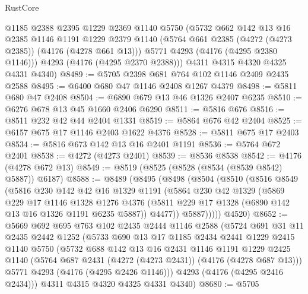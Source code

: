 \begin{lexlean}{RustCore}
\begin{coremodule}
        @1185
        @2388
        @2395
        @1229
        @2369
        @1140
        @5750
        (@5732
          @662
          @142
          @13
          @16
          @2385
          @1146
          @1191
          @1229
          @2379
          @1140
          (@5764 @661 @2385 (@4272 (@4273 @2385)) (@4176 (@4278 @661 @13)))
          @5771
          @4293
          (@4176 (@4295 @2380 @1146)))
        @4293
        (@4176 (@4295 @2370 @2388)))
      @4311
      @4315
      @4320
      @4325
      @4331
      @4340)
@8489 := @5705 @2398 @681 @764 @102 @1146 @2409 @2435 @2588
@8495 := @6400 @680 @47 @1146 @2408 @1267 @4379
@8498 := @5811 @680 @47 @2408
@8504 := @6890 @679 @13 @46 @1326 @2407 @6235
@8510 := @6276 @678 @13 @45 @1660 @2406 @6290
@8511 := @5816 @676
@8516 := @8511 @232 @42 @44 @2404 @1331
@8519 := @5864 @676 @42 @2404
@8525 := @6157 @675 @17 @1146 @2403 @1622 @4376
@8528 := @5811 @675 @17 @2403
@8534 := @5816 @673 @142 @13 @16 @2401 @1191
@8536 := @5764 @672 @2401
@8538 := @4272 (@4273 @2401)
@8539 := @8536 @8538
@8542 := @4176 (@4278 @672 @13)
@8549 := @8519 (@8525 (@8528 (@8534 (@8539 @8542) @5887)) @6187)
@8588 := @8489
    (@8495
      (@8498
        (@8504
          (@8510
            (@8516
              @8549
              (@5816
                @230
                @142
                @42
                @16
                @1329
                @1191
                (@5864
                  @230
                  @42
                  @1329
                  (@5869
                    @229
                    @17
                    @1146
                    @1328
                    @1276
                    @4376
                    (@5811 @229 @17 @1328 (@6890 @142 @13 @16 @1326 @1191 @6235 @5887))
                    @4477))
                @5887)))))
      @4520)
@8652 := @5669
    @692
    @695
    @763
    @102
    @2435
    @2444
    @1146
    @2588
    (@5724
      @691
      @31
      @11
      @2435
      @2442
      @1252
      (@5733
        @690
        @13
        @17
        @1185
        @2434
        @2441
        @1229
        @2415
        @1140
        @5750
        (@5732
          @688
          @142
          @13
          @16
          @2431
          @1146
          @1191
          @1229
          @2425
          @1140
          (@5764 @687 @2431 (@4272 (@4273 @2431)) (@4176 (@4278 @687 @13)))
          @5771
          @4293
          (@4176 (@4295 @2426 @1146)))
        @4293
        (@4176 (@4295 @2416 @2434)))
      @4311
      @4315
      @4320
      @4325
      @4331
      @4340)
@8680 := @5705

\end{coremodule}
\end{lexlean}
